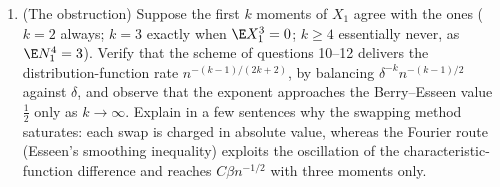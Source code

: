\begin{problem}
\begin{enumerate}[resume]
{        $\delta = n^{-1/4}$)}.
  \item (The obstruction) Suppose the first $k$ moments of
        $X_1$ agree with the  ones ($k = 2$ always;
        $k = 3$ exactly when $\E X_1^3 = 0$; $k \geq 4$
        essentially never, as $\E N_1^4 = 3$). Verify that
        the scheme of questions 10--12 delivers the
        distribution-function rate
        $n^{-(k-1)/(2k+2)}$, by balancing
        $\delta^{-k}n^{-(k-1)/2}$ against $\delta$, and
        observe that the exponent approaches the
        Berry--Esseen value $\frac12$ only as $k \to
        \infty$. Explain in a few sentences why the
        swapping method saturates: each swap is charged in
        absolute value, whereas the Fourier route
        (Esseen's smoothing inequality) exploits the
        oscillation of the characteristic-function
        difference and reaches $C\beta n^{-1/2}$ with three
        moments only.
\end{enumerate}


\end{problem}
